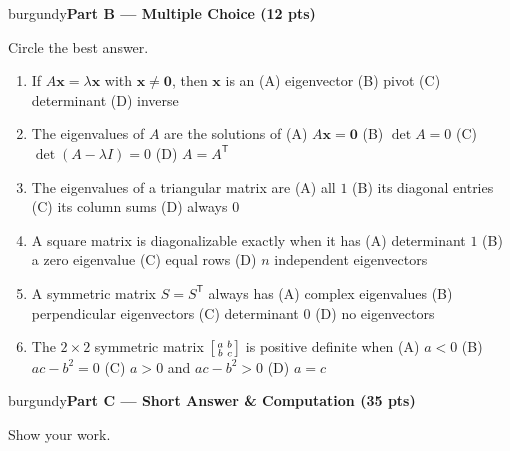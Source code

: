 \documentclass[10pt]{article}
\newcommand{\xx}{\mathbf{x}}
\newcommand{\T}{^{\mathsf T}}
\newcommand{\parthead}[1]{%
  \vspace{6pt}\noindent
  \begin{headlinebox}{burgundy}{\color{white}\bfseries #1}\end{headlinebox}%
  \vspace{4pt}}
\begin{document}
\parthead{Part B --- Multiple Choice (12 pts)}
Circle the best answer.

\begin{enumerate}[leftmargin=1.9em, itemsep=9pt]
  \item If $A\xx=\lambda\xx$ with $\xx\ne\mathbf{0}$, then $\xx$ is an
    \hfill (A) eigenvector \quad (B) pivot \quad (C) determinant \quad (D) inverse
  \item The eigenvalues of $A$ are the solutions of
    \hfill (A) $A\xx=\mathbf{0}$ \quad (B) $\det A=0$ \quad (C) $\det(A-\lambda I)=0$ \quad (D) $A=A\T$
  \item The eigenvalues of a triangular matrix are
    \hfill (A) all $1$ \quad (B) its diagonal entries \quad (C) its column sums \quad (D) always $0$
  \item A square matrix is diagonalizable exactly when it has
    \hfill (A) determinant $1$ \quad (B) a zero eigenvalue \quad (C) equal rows \quad (D) $n$ independent eigenvectors
  \item A symmetric matrix $S=S\T$ always has
    \hfill (A) complex eigenvalues \quad (B) perpendicular eigenvectors \quad (C) determinant $0$ \quad (D) no eigenvectors
  \item The $2\times2$ symmetric matrix $\begin{bsmallmatrix}a&b\\b&c\end{bsmallmatrix}$ is positive definite when
    \hfill (A) $a<0$ \quad (B) $ac-b^2=0$ \quad (C) $a>0$ and $ac-b^2>0$ \quad (D) $a=c$
\end{enumerate}

\parthead{Part C --- Short Answer \& Computation (35 pts)}
Show your work.
\end{document}
